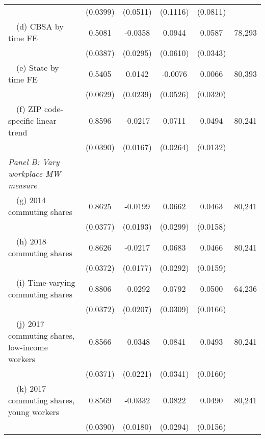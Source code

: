 \begin{landscape}
\begin{table}[ht!]
\begin{tabular}{@{}lccccc@{}}
                                                             & (0.0399) & (0.0511) & (0.1116) & (0.0811) &      \\
        $\quad$(d) CBSA by time FE                           &  0.5081  &  -0.0358  &  0.0944  &  0.0587  & 78,293 \\
                                                             & (0.0387) & (0.0295) & (0.0610) & (0.0343) &      \\
        $\quad$(e) State by time FE                          &  0.5405  &  0.0142  &  -0.0076  &  0.0066  & 80,393 \\
                                                             & (0.0629) & (0.0239) & (0.0526) & (0.0320) &      \\
        $\quad$(f) ZIP code-specific linear trend            &  0.8596  &  -0.0217  &  0.0711  &  0.0494  & 80,241 \\
                                                             & (0.0390) & (0.0167) & (0.0264) & (0.0132) &      \\
        \textit{Panel B: Vary workplace MW measure}          &       &       &       &       &      \\
        $\quad$(g) 2014 commuting shares                     &  0.8625  &  -0.0199  &  0.0662  &  0.0463  & 80,241 \\
                                                             & (0.0377) & (0.0193) & (0.0299) & (0.0158) &      \\
        $\quad$(h) 2018 commuting shares                     &  0.8626  &  -0.0217  &  0.0683  &  0.0466  & 80,241 \\
                                                             & (0.0372) & (0.0177) & (0.0292) & (0.0159) &      \\
        $\quad$(i) Time-varying commuting shares             &  0.8806  &  -0.0292  &  0.0792  &  0.0500  & 64,236 \\
                                                             & (0.0372) & (0.0207) & (0.0309) & (0.0166) &      \\
        $\quad$(j) 2017 commuting shares, low-income workers &  0.8566  &  -0.0348  &  0.0841  &  0.0493  & 80,241 \\
                                                             & (0.0371) & (0.0221) & (0.0341) & (0.0160) &      \\
        $\quad$(k) 2017 commuting shares, young workers      &  0.8569  &  -0.0332  &  0.0822  &  0.0490  & 80,241 \\
                                                             & (0.0390) & (0.0180) & (0.0294) & (0.0156) &      \\ \bottomrule
    \end{tabular}


\end{table}
\end{landscape}
